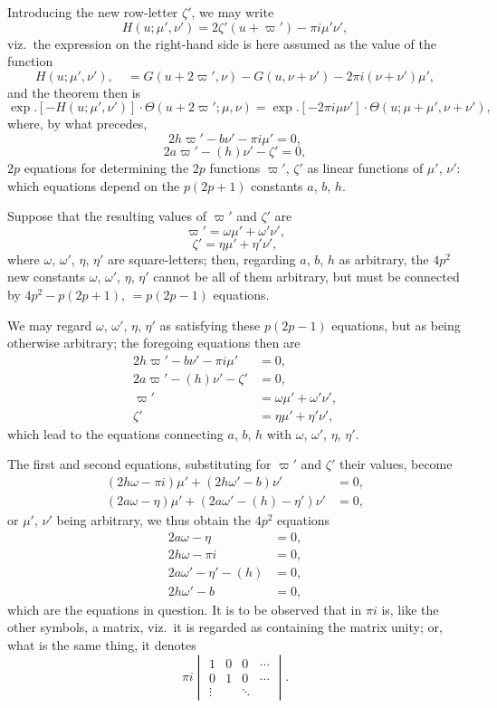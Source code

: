 \documentclass[11pt,a4paper]{article}
\begin{document}
Introducing the new row-letter $\zeta'$, we may write
\[
  H(u; \mu', \nu') = 2\zeta'(u + \varpi') - \pi i \mu' \nu',
\]
viz.\ the expression on the right-hand side is here assumed as the value of
the function
\[
  H(u; \mu', \nu'), \quad = G(u + 2\varpi', \nu) - G(u, \nu + \nu')
   - 2\pi i (\nu + \nu') \mu',
\]
and the theorem then is
\[
  \exp.[-H(u; \mu', \nu')] \cdot \Theta(u + 2\varpi'; \mu, \nu)
   = \exp.[-2\pi i \mu \nu'] \cdot \Theta(u; \mu + \mu', \nu + \nu'),
\]
where, by what precedes,
\[
  2h\varpi' - b\nu' - \pi i \mu' = 0,
\]
\[
  2a\varpi' - (h)\nu' - \zeta' = 0,
\]
$2p$ equations for determining the $2p$ functions $\varpi'$, $\zeta'$ as
linear functions of $\mu'$, $\nu'$: which equations depend on the
$p(2p + 1)$ constants $a$, $b$, $h$.

Suppose that the resulting values of $\varpi'$ and $\zeta'$ are
\[
  \varpi' = \omega\mu' + \omega'\nu',
\]
\[
  \zeta' = \eta\mu' + \eta'\nu',
\]
where $\omega$, $\omega'$, $\eta$, $\eta'$ are square-letters; then,
regarding $a$, $b$, $h$ as arbitrary, the $4p^{2}$ new constants $\omega$,
$\omega'$, $\eta$, $\eta'$ cannot be all of them arbitrary, but must be
connected by $4p^{2} - p(2p + 1)$, $= p(2p - 1)$ equations.

We may regard $\omega$, $\omega'$, $\eta$, $\eta'$ as satisfying these
$p(2p - 1)$ equations, but as being otherwise arbitrary; the foregoing
equations then are
\begin{align*}
  2h\varpi' - b\nu' - \pi i \mu' & = 0, \\
  2a\varpi' - (h)\nu' - \zeta' & = 0, \\
  \varpi' & = \omega\mu' + \omega'\nu', \\
  \zeta' & = \eta\mu' + \eta'\nu',
\end{align*}
which lead to the equations connecting $a$, $b$, $h$ with $\omega$, $\omega'$,
$\eta$, $\eta'$.

The first and second equations, substituting for $\varpi'$ and $\zeta'$
their values, become
\begin{align*}
  (2h\omega - \pi i)\mu' + (2h\omega' - b)\nu' & = 0, \\
  (2a\omega - \eta)\mu' + (2a\omega' - (h) - \eta')\nu' & = 0,
\end{align*}
or $\mu'$, $\nu'$ being arbitrary, we thus obtain the $4p^{2}$ equations
\begin{align*}
  2a\omega - \eta & = 0, \\
  2h\omega - \pi i & = 0, \\
  2a\omega' - \eta' - (h) & = 0, \\
  2h\omega' - b & = 0,
\end{align*}
which are the equations in question.  It is to be observed that in $\pi i$
is, like the other symbols, a matrix, viz.\ it is regarded as containing the
matrix unity; or, what is the same thing, it denotes
\[
  \pi i \begin{vmatrix}
   1 & 0 & 0 & \cdots \\
   0 & 1 & 0 & \cdots \\
   \vdots & & \ddots &
  \end{vmatrix}.
\]
\end{document}
